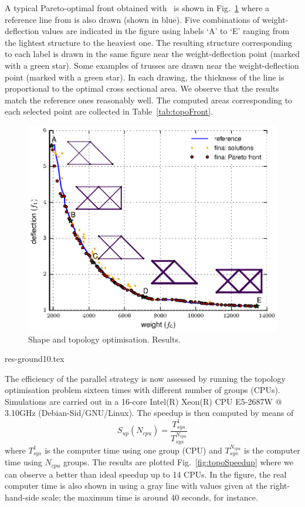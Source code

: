 \documentclass[final,5p,times,twocolumn]{elsarticle}
\newcommand{\tabname} {Table}
\newcommand{\figname} {Fig.}
\begin{document}
A typical Pareto-optimal front obtained with \goga~is shown in \figname~\ref{fig:topoFront} where a
reference line from \citep{deb:01a} is also drawn (shown in blue). Five combinations of
weight-deflection values are indicated in the figure using labels `A' to `E' ranging from the
lightest structure to the heaviest one. The resulting structure corresponding to each label is drawn
in the same figure near the weight-deflection point (marked with a green star). Some examples of
trusses are drawn near the weight-deflection point (marked with a green star). In each drawing, the
thickness of the line is proportional to the optimal cross sectional area. We observe that the
results match the reference ones reasonably well. The computed areas corresponding to each selected
point are collected in \tabname~\ref{tab:topoFront}.

\begin{figure} \centering
\includegraphics[scale=1]{./figs/res/ground10.eps}
\caption{Shape and topology optimisation. Results.}
\label{fig:topoFront}
\end{figure}

{res-ground10.tex}


The efficiency of the parallel strategy is now assessed by running the topology optimisation problem
sixteen times with different number of groups (CPUs). Simulations are carried out in a 16-core
Intel(R) Xeon(R) CPU E5-2687W @ 3.10GHz (Debian-Sid/GNU/Linux). The speedup is then computed by means
of
\begin{equation}
    S_{up}(N_{cpu}) = \frac{T_{sys}^1}{T_{sys}^{N_{cpu}}}
\end{equation}
where $T_{sys}^1$ is the computer time using one group (CPU) and $T_{sys}^{N_{cpu}}$ is the computer
time using $N_{cpu}$ groups. The results are plotted \figname~\ref{fig:topoSpeedup} where we can
observe a better than ideal speedup up to 14 CPUs. In the figure, the real computer time is also
shown in using a gray line with values given at the right-hand-side scale; the maximum time is
around 40 seconds, for instance.
\end{document}
